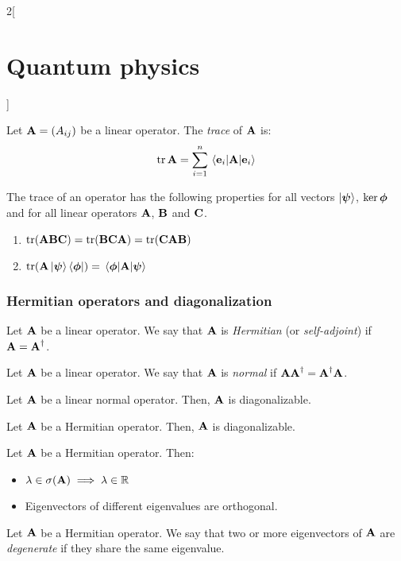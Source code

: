 \documentclass[../../../main_physics.tex]{subfiles}
\begin{document}
\begin{multicols}{2}[\section{Quantum physics}]
\begin{definition}
    Let $\boldsymbol{\mathrm{A}}=(A_{ij})$ be a linear operator. The \emph{trace} of $\boldsymbol{\mathrm{A}}$ is: $$\trace\vf{A}=\sum_{i=1}^n\mel{\vf{e}_i}{\vf{A}}{\vf{e}_i}$$
  \end{definition}
  \begin{proposition}
    The trace of an operator has the following properties for all vectors $\ket{\boldsymbol{\mathrm{\psi}}}$, $\ker{\boldsymbol{\mathrm{\phi}}}$ and for all linear operators $\boldsymbol{\mathrm{A}}$, $\boldsymbol{\mathrm{B}}$ and $\boldsymbol{\mathrm{C}}$.
    \begin{enumerate}
      \item $\trace(\vf{ABC})=\trace(\vf{BCA})=\trace(\vf{CAB})$
      \item $\trace(\vf{A}\ket{\vf\psi}\bra{\vf\phi})=\mel{\vf\phi}{\vf{A}}{\vf\psi}$
    \end{enumerate}
  \end{proposition}
  \subsubsection{Hermitian operators and diagonalization}
  \begin{definition}
    Let $\boldsymbol{\mathrm{A}}$ be a linear operator. We say that $\boldsymbol{\mathrm{A}}$ is \emph{Hermitian} (or \emph{self-adjoint}) if $\boldsymbol{\mathrm{A}}=\boldsymbol{\mathrm{A}}^\dag$.
  \end{definition}
  \begin{definition}
    Let $\boldsymbol{\mathrm{A}}$ be a linear operator. We say that $\boldsymbol{\mathrm{A}}$ is \emph{normal} if $\boldsymbol{\mathrm{A}}\boldsymbol{\mathrm{A}}^\dag=\boldsymbol{\mathrm{A}}^\dag\boldsymbol{\mathrm{A}}$.
  \end{definition}
  \begin{proposition}
    Let $\boldsymbol{\mathrm{A}}$ be a linear normal operator. Then, $\boldsymbol{\mathrm{A}}$ is diagonalizable.
  \end{proposition}
  \begin{corollary}
    Let $\boldsymbol{\mathrm{A}}$ be a Hermitian operator. Then, $\boldsymbol{\mathrm{A}}$ is diagonalizable.
  \end{corollary}
  \begin{proposition}
    Let $\boldsymbol{\mathrm{A}}$ be a Hermitian operator. Then:
    \begin{itemize}
      \item $\lambda\in\sigma(\boldsymbol{\mathrm{A}})\implies\lambda\in\mathbb{R}$
      \item Eigenvectors of different eigenvalues are orthogonal.
    \end{itemize}
  \end{proposition}
  \begin{definition}
    Let $\boldsymbol{\mathrm{A}}$ be a Hermitian operator. We say that two or more eigenvectors of $\boldsymbol{\mathrm{A}}$ are \emph{degenerate} if they share the same eigenvalue.

\end{definition}
\end{multicols}
\end{document}
